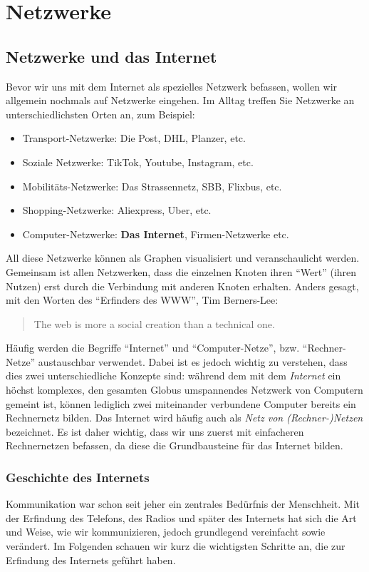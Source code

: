 \chapter{Netzwerke}

\section{Netzwerke und das Internet}
Bevor wir uns mit dem Internet als spezielles Netzwerk befassen, wollen wir allgemein nochmals auf Netzwerke eingehen. Im Alltag treffen Sie Netzwerke an unterschiedlichsten Orten an, zum Beispiel:
\begin{itemize}
	\item Transport-Netzwerke: Die Post, DHL, Planzer, etc.
	\item Soziale Netzwerke: TikTok, Youtube, Instagram, etc.
	\item Mobilitäts-Netzwerke: Das Strassennetz, SBB, Flixbus, etc.
	\item Shopping-Netzwerke: Aliexpress, Uber, etc.
	\item Computer-Netzwerke: \textbf{Das Internet}, Firmen-Netzwerke etc.
\end{itemize}

All diese Netzwerke können als Graphen visualisiert und veranschaulicht werden. Gemeinsam ist allen Netzwerken, dass die einzelnen Knoten ihren \enquote{Wert} (ihren Nutzen) erst durch die Verbindung mit anderen Knoten erhalten. Anders gesagt, mit den Worten des \enquote{Erfinders des \gls{WWW}}, Tim Berners-Lee:

\begin{quotation}
	The web is more a social creation than a technical one.
\end{quotation}

Häufig werden die Begriffe \enquote{Internet} und \enquote{Computer-Netze}, bzw. \enquote{Rechner-Netze} austauschbar verwendet. Dabei ist es jedoch wichtig zu verstehen, dass dies zwei unterschiedliche Konzepte sind: während dem mit dem \textit{Internet} ein höchst komplexes, den gesamten Globus umspannendes Netzwerk von Computern gemeint ist, können lediglich zwei miteinander verbundene Computer bereits ein Rechnernetz bilden. Das Internet wird häufig auch als \textit{Netz von (Rechner-)Netzen} bezeichnet. Es ist daher wichtig, dass wir uns zuerst mit einfacheren Rechnernetzen befassen, da diese die Grundbausteine für das Internet bilden.

\subsection{Geschichte des Internets}
Kommunikation war schon seit jeher ein zentrales Bedürfnis der Menschheit. Mit der Erfindung des Telefons, des Radios und später des Internets hat sich die Art und Weise, wie wir kommunizieren, jedoch grundlegend vereinfacht sowie verändert. Im Folgenden schauen wir kurz die wichtigsten Schritte an, die zur Erfindung des Internets geführt haben.


